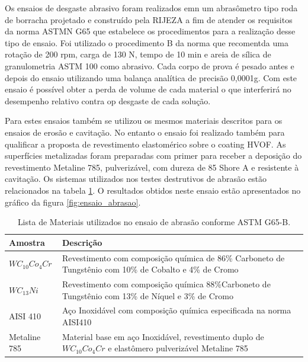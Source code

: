 Os ensaios de  desgaste abrasivo foram realizados emn um abrasômetro tipo roda
de borracha projetado e construído pela RIJEZA a fim de atender os requisitos
da norma ASTMN G65 que estabelece os procedimentos para a realização desse tipo
de ensaio. Foi utilizado o procedimento B da norma que recomentda uma rotação
de 200 rpm, carga de 130 N, tempo de 10 min e areia de sílica de granulometria
ASTM 100 como abrasivo. Cada corpo de prova é pesado antes e depois do ensaio
utilizando uma balança analítica de precisão 0,0001g. Com este ensaio é
possível obter a perda de volume de cada material o que interferirá no
desempenho relativo contra op desgaste de cada solução.

Para estes ensaios também se utilizou os mesmos materiais descritos para os
ensaios de erosão e cavitação. No entanto o ensaio foi realizado também para
qualificar a proposta de revestimento elastomérico sobre o coating HVOF. As
superfícies metalizadas foram preparadas com primer para receber a deposição do
revestimento Metaline 785, pulverizável, com dureza de 85 Shore A e resistente
à cavitação. Os sistemas utilizados nos testes destrutivos de abrasão estão
relacionados na tabela \ref{tab:ensaio_abrasao}. O resultados obtidos neste
ensaio estão apresentados no gráfico da figura \ref{fig:ensaio_abrasao}.

\begin{table}[H]
\centering
\begin{tabular}{|l|p{8cm}|}
Amostra     & Descrição \\ \hline
$WC_{10}Co_{4}Cr$   & Revestimento com composição química de 86\% Carboneto de
Tungstênio com 10\% de Cobalto e 4\% de Cromo \\ \hline
$WC_{13}Ni$         & Revestimento com composição química 88\%Carboneto de
Tungstênio com 13\% de Níquel e 3\% de Cromo \\ \hline
AISI 410            & Aço Inoxidável com composição química especificada na
norma AISI410 \\ \hline
Metaline 785        & Material base em aço Inoxidável, revestimento duplo de
$WC_{10}Co_{4}Cr$ e elastômero pulverizável Metaline 785 \\ \hline
\end{tabular}
\caption{Lista de Materiais utilizados no ensaio de abrasão conforme ASTM
G65-B.}
\label{tab:ensaio_abrasao}
\end{table}

